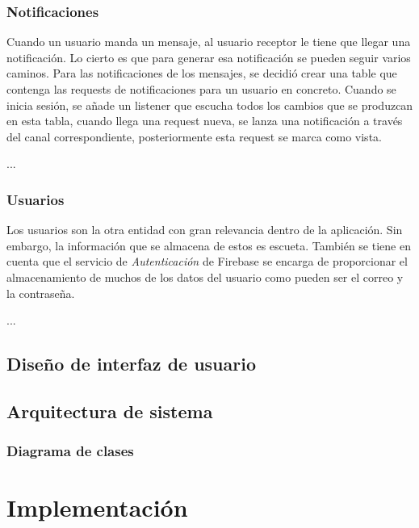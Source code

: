 \documentclass[a4paper, 12pt]{article}
\begin{document}
\subsubsection{Notificaciones}

Cuando un usuario manda un mensaje, al usuario receptor le tiene que llegar una notificación. Lo cierto es que para generar esa notificación se pueden seguir varios caminos. Para las notificaciones de los mensajes, se decidió crear una table que contenga las requests de notificaciones para un usuario en concreto. Cuando se inicia sesión, se añade un listener que escucha todos los cambios que se produzcan en esta tabla, cuando llega una request nueva, se lanza una notificación a través del canal correspondiente, posteriormente esta request se marca como vista. 

...


\subsubsection{Usuarios}

Los usuarios son la otra entidad con gran relevancia dentro de la aplicación. Sin embargo, la información que se almacena de estos es escueta. También se tiene en cuenta que el servicio de \textit{Autenticación} de Firebase se encarga de proporcionar el almacenamiento de muchos de los datos del usuario como pueden ser el correo y la contraseña.  

...




\subsection{Diseño de interfaz de usuario}
\subsection{Arquitectura de sistema}
\subsubsection{Diagrama de clases}

\newpage
\section{Implementación}

\printindex
\end{document}
